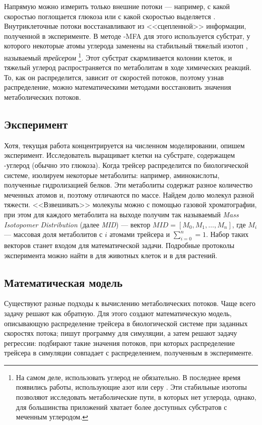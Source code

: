 \documentclass[a4paper, 12pt, left=30mm, right=15mm, top=20mm, bottom=20mm]{report}
\begin{document}
Напрямую можно измерить только внешние потоки --- например, с какой скоростью поглощается глюкоза или с какой скоростью выделяется . Внутриклеточные потоки восстанавливают из <<сцепленной>> информации, полученной в эксперименте. В методе -MFA для этого  используется субстрат, у которого некоторые атомы углерода заменены на стабильный тяжелый изотоп , называемый \emph{трейсером}
\footnote{На самом деле, использовать углерод не обязательно. В последнее время появились работы, использующие  азот \cite{nitrogen_mfa} или  серу \cite{sulfur_mfa}. Эти стабильные изотопы позволяют исследовать метаболические пути, в которых нет углерода, однако, для большинства приложений хватает более доступных субстратов с меченным углеродом.}. 
Этот субстрат скармливается колонии клеток, и тяжелый углерод распространяется по метаболитам в ходе химических реакций. То, как он распределится, зависит от скоростей потоков, поэтому узнав распределение, можно математическими методами восстановить значения метаболических потоков.

\subsection{Эксперимент}
Хотя, текущая работа концентрируется на численном моделировании, опишем эксперимент\cite[стр. 312]{protocol}. Исследователь выращивает клетки на субстрате, содержащем -углерод (обычно это глюкоза). Когда трейсер распределится по биологической системе, изолируем некоторые метаболиты: например, аминокислоты, полученные гидролизацией белков. Эти метаболиты содержат разное количество меченных атомов и, поэтому отличаются по массе. Найдем долю молекул разной тяжести. <<Взвешивать>> молекулы можно с помощью газовой хроматографии, при этом для каждого метаболита на выходе получим так называемый \emph{Mass Isotopomer Distribution} (далее \emph{MID}) --- вектор $M\!I\!D = [M_0, M_1, \ldots, M_n]$, где $M_i$ --- массовая доля метаболитов с $i$ атомами трейсера и $\sum_{i = 0}^{n} = 1$. Набор таких векторов станет входом для математической задачи. Подробные протоколы эксперимента можно найти в \cite{protocol_animal} для животных клеток и в \cite{protocol_plant} для растений.

\subsection{Математическая модель}
Существуют разные подходы к вычислению метаболических потоков. Чаще всего задачу решают как обратную. Для этого создают математическую модель, описывающую распределение трейсера в биологической системе при заданных скоростях потока; пишут программу для симуляции, а затем решают задачу регрессии: подбирают такие значения потоков, при которых распределение трейсера в симуляции совпадает с распределением, полученным в эксперименте.
\end{document}
